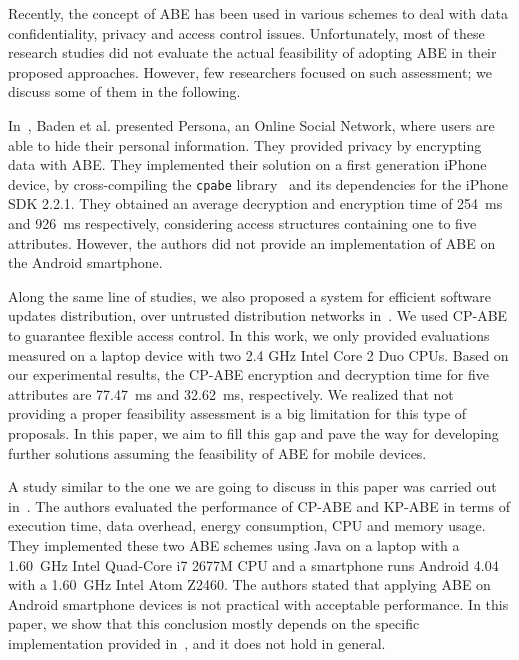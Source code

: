 \documentclass{sig-alternate-2013}
\begin{document}
Recently, the concept of ABE has been used in various schemes to deal with data confidentiality, privacy and access control issues. Unfortunately, most of these research studies did not evaluate the actual feasibility of adopting ABE in their proposed approaches. However, few researchers focused on such assessment; we discuss some of them in the following. 


In~\cite{Baden:2009:POS:1594977.1592585}, Baden et al. presented Persona, an Online Social Network, where users are able to hide their personal information. 
They provided privacy by encrypting data with ABE. They implemented their solution on a first generation iPhone device, by cross-compiling the {\tt cpabe} library~\cite{cpabe} and its dependencies for the iPhone SDK 2.2.1. 
They obtained an average decryption and encryption time of 254~ms and 926~ms respectively, considering access structures containing one to five attributes. However, the authors did not provide an implementation of ABE on the Android smartphone.





Along the same line of studies, we also proposed a system for efficient
software updates distribution, over untrusted distribution networks in~\cite{Moreno_ESORICS}. We used CP-ABE to guarantee flexible access control.
In this work, we only provided evaluations measured on a laptop device with two 2.4 GHz Intel Core 2 Duo CPUs. Based on our experimental results, the CP-ABE encryption and decryption time for five attributes are 77.47~ms and 32.62~ms, respectively.
We realized that not providing a proper feasibility assessment is a big limitation for this type of proposals. In this paper, we aim to fill this gap and pave the way for developing further solutions assuming the feasibility of ABE for mobile devices.

A study similar to the one we are going to discuss in this paper was carried out in~\cite{ABE_icc_2014}. The authors evaluated the performance of CP-ABE and KP-ABE in terms of execution time, data overhead, energy consumption, CPU and memory usage. They implemented these two ABE schemes using Java on a laptop with a 1.60~GHz Intel Quad-Core i7 2677M CPU and a smartphone runs Android 4.04 with a 1.60~GHz Intel Atom Z2460. The authors stated that applying ABE on Android smartphone devices is not practical with acceptable performance. 
In this paper, we show that this conclusion mostly depends on the specific implementation provided in~\cite{ABE_icc_2014}, and it does not hold in general. 
\end{document}
